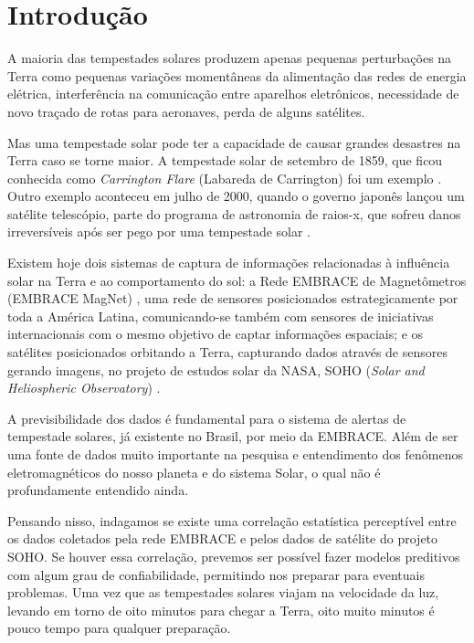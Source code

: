 \documentclass[12pt, 2024, professor]{uftpibic}
\theoremstyle{plain}
\begin{document}
\chapter{Introdução}

A maioria das tempestades solares produzem apenas pequenas perturbações na Terra como pequenas variações momentâneas da alimentação das redes de energia elétrica, interferência na comunicação entre aparelhos eletrônicos, necessidade de novo traçado de rotas para aeronaves, perda de alguns satélites. 

Mas uma tempestade solar pode ter a capacidade de causar grandes desastres na Terra caso se torne maior. A tempestade solar de setembro de 1859, que ficou conhecida como \textit{Carrington Flare} (Labareda de Carrington) foi um exemplo \cite{Carrington2003}. Outro exemplo aconteceu em julho de 2000, quando o governo japonês lançou um satélite telescópio, parte do programa de astronomia de raios-x, que sofreu danos irreversíveis após ser pego por uma tempestade solar \cite{Dennis2000}.

Existem hoje dois sistemas de captura de informações relacionadas à influência solar na Terra e ao comportamento do sol: a Rede EMBRACE de Magnetômetros (EMBRACE MagNet) \cite{Denardini2015,Denardini2016,Denardini2018,Denardini2018b}, uma rede de sensores posicionados estrategicamente por toda a América Latina, comunicando-se também com sensores de iniciativas internacionais com o mesmo objetivo de captar informações espaciais; e os satélites posicionados orbitando a Terra, capturando dados através de sensores gerando imagens, no projeto de estudos solar da NASA, SOHO (\textit{Solar and Heliospheric Observatory}) \cite{Akmal2001}.

A previsibilidade dos dados é fundamental para o sistema de alertas de tempestade solares, já existente no Brasil, por meio da EMBRACE. Além de ser uma fonte de dados muito importante na pesquisa e entendimento dos fenômenos eletromagnéticos do nosso planeta e do sistema Solar, o qual não é profundamente entendido ainda.

Pensando nisso, indagamos se existe uma correlação estatística perceptível entre os dados coletados pela rede EMBRACE e pelos dados de satélite do projeto SOHO. Se houver essa correlação, prevemos ser possível fazer modelos preditivos com algum grau de confiabilidade, permitindo nos preparar para eventuais problemas. Uma vez que as tempestades solares viajam na velocidade da luz, levando em torno de oito minutos para chegar a Terra, oito muito minutos é pouco tempo para qualquer preparação.
\end{document}
